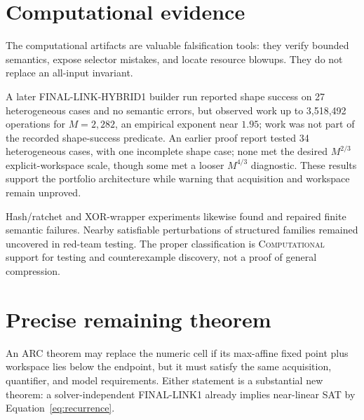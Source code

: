 \documentclass[11pt]{article}
\newcommand{\Comp}{\textsc{Computational}}
\begin{document}
\section{Computational evidence}

The computational artifacts are valuable falsification tools: they verify bounded semantics, expose selector mistakes, and locate resource blowups.  They do not replace an all-input invariant.

A later FINAL-LINK-HYBRID1 builder run reported shape success on 27 heterogeneous cases and no semantic errors, but observed work up to 3,518,492 operations for $M=2,282$, an empirical exponent near $1.95$; work was not part of the recorded shape-success predicate.  An earlier proof report tested 34 heterogeneous cases, with one incomplete shape case; none met the desired $M^{2/3}$ explicit-workspace scale, though some met a looser $M^{4/3}$ diagnostic.  These results support the portfolio architecture while warning that acquisition and workspace remain unproved.

Hash/ratchet and XOR-wrapper experiments likewise found and repaired finite semantic failures.  Nearby satisfiable perturbations of structured families remained uncovered in red-team testing.  The proper classification is \Comp{} support for testing and counterexample discovery, not a proof of general compression.

\section{Precise remaining theorem}

\begin{center}
\end{center}

An ARC theorem may replace the numeric cell if its max-affine fixed point plus workspace lies below the endpoint, but it must satisfy the same acquisition, quantifier, and model requirements.  Either statement is a substantial new theorem: a solver-independent FINAL-LINK1 already implies near-linear SAT by Equation~\ref{eq:recurrence}.
\end{document}
